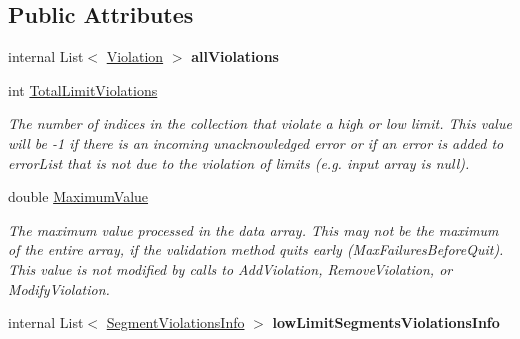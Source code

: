 \subsection*{Public Attributes}
\begin{DoxyCompactItemize}
\item 
\mbox{\label{struct_c_s_i_1_1_library_1_1_array_utilities_1_1_array_limit_checks_1_1_violations_info_a121390e2e4d37b934aecffdd7370612f}} 
internal List$<$ \mbox{\hyperlink{class_c_s_i_1_1_library_1_1_array_utilities_1_1_array_limit_checks_1_1_violation}{Violation}} $>$ {\bfseries all\+Violations}
\item 
int \mbox{\hyperlink{struct_c_s_i_1_1_library_1_1_array_utilities_1_1_array_limit_checks_1_1_violations_info_a55b918a4ed299b545693f52f8345a6d3}{Total\+Limit\+Violations}}
\begin{DoxyCompactList}\small\item\em The number of indices in the collection that violate a high or low limit. This value will be -\/1 if there is an incoming unacknowledged error or if an error is added to error\+List that is not due to the violation of limits (e.\+g. input array is null). \end{DoxyCompactList}\item 
double \mbox{\hyperlink{struct_c_s_i_1_1_library_1_1_array_utilities_1_1_array_limit_checks_1_1_violations_info_a4aab054ecd40dc59dbd5e06950366349}{Maximum\+Value}}
\begin{DoxyCompactList}\small\item\em The maximum value processed in the data array. This may not be the maximum of the entire array, if the validation method quits early (Max\+Failures\+Before\+Quit). This value is not modified by calls to Add\+Violation, Remove\+Violation, or Modify\+Violation. \end{DoxyCompactList}\item 
\mbox{\label{struct_c_s_i_1_1_library_1_1_array_utilities_1_1_array_limit_checks_1_1_violations_info_a45d51870eda173df0e75aa8ade5e00d6}} 
internal List$<$ \mbox{\hyperlink{class_c_s_i_1_1_library_1_1_array_utilities_1_1_array_limit_checks_1_1_segment_violations_info}{Segment\+Violations\+Info}} $>$ {\bfseries low\+Limit\+Segments\+Violations\+Info}
\item 

\end{DoxyCompactItemize}
